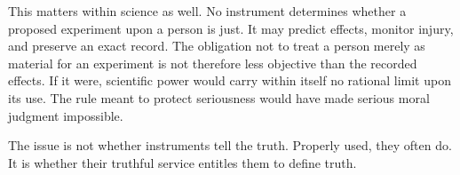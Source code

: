 This matters within science as well. No instrument determines whether a proposed experiment upon a person is just. It may predict effects, monitor injury, and preserve an exact record. The obligation not to treat a person merely as material for an experiment is not therefore less objective than the recorded effects. If it were, scientific power would carry within itself no rational limit upon its use. The rule meant to protect seriousness would have made serious moral judgment impossible.

The issue is not whether instruments tell the truth. Properly used, they often do. It is whether their truthful service entitles them to define truth.
